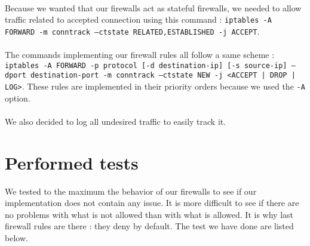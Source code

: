 \documentclass[a4paper, 11pt, oneside]{article}
\begin{document}
\paragraph{}Because we wanted that our firewalls act as stateful firewalls, we needed to allow traffic related to accepted connection using this command : \texttt{iptables -A FORWARD -m conntrack --ctstate RELATED,ESTABLISHED -j ACCEPT}.

\paragraph{}The commands implementing our firewall rules all follow a same scheme : \texttt{iptables -A FORWARD -p protocol [-d destination-ip] [-s source-ip] --dport destination-port -m conntrack --ctstate NEW -j <ACCEPT | DROP | LOG>}. These rules are implemented in their priority orders because we used the \texttt{-A} option. 

\paragraph{}We also decided to log all undesired traffic to easily track it.

\section{Performed tests}

We tested to the maximum the behavior of our firewalls to see if our implementation does not contain any issue. It is more difficult to see if there are no problems with what is not allowed than with what is allowed. It is why last firewall rules are there : they deny by default. The test we have done are listed below.
\end{document}
